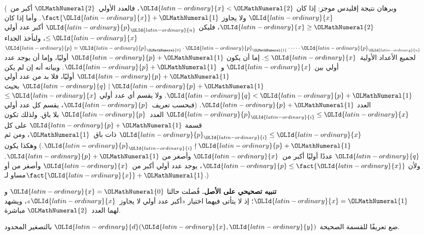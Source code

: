 \documentclass[../../../include/open-logic-section]{subfiles}
\begin{document}
(وبرهان نتيجة إقليدس موجز: إذا كان $\OLId{latin-ordinary}{x}<\OLMathNumeral{2}$، فالعدد الأولي~$\OLMathNumeral{2}$ أكبر
من~$\OLId{latin-ordinary}{x}$ ولا يجاوز $\fact{\OLId{latin-ordinary}{x}}+\OLMathNumeral{1}$. وأما إذا كان $\OLId{latin-ordinary}{x}\geq\OLMathNumeral{2}$، فليكن $\OLId{latin-ordinary}{p}_\OLId{latin-ordinary}{n}$
أكبر عدد أولي $\le \OLId{latin-ordinary}{x}$، ولنأخذ الجداء
$\OLId{latin-ordinary}{p}=\OLId{latin-ordinary}{p}_\OLMathNumeral{0}\cdot \OLId{latin-ordinary}{p}_\OLMathNumeral{1}\cdot\dots\cdot \OLId{latin-ordinary}{p}_\OLId{latin-ordinary}{n}$ لجميع الأعداد الأولية~$\le \OLId{latin-ordinary}{x}$.
إما أن يكون $\OLId{latin-ordinary}{p}+\OLMathNumeral{1}$ أوليًا، وإما أن يوجد عدد أولي بين $\OLId{latin-ordinary}{x}$ و~$\OLId{latin-ordinary}{p}+\OLMathNumeral{1}$.
وبيانه أنه إن لم يكن $\OLId{latin-ordinary}{p}+\OLMathNumeral{1}$ أوليًا، فلا بد من عدد أولي $\OLId{latin-ordinary}{q}\mid \OLId{latin-ordinary}{p}+\OLMathNumeral{1}$
بحيث $\OLId{latin-ordinary}{q}<\OLId{latin-ordinary}{p}+\OLMathNumeral{1}$. ولا يقسم أي عدد أولي $\le \OLId{latin-ordinary}{x}$ العدد $\OLId{latin-ordinary}{p}+\OLMathNumeral{1}$. (فبحسب
تعريف~$\OLId{latin-ordinary}{p}$، يقسم كل عدد أولي $\OLId{latin-ordinary}{p}_\OLId{latin-ordinary}{i}\le \OLId{latin-ordinary}{x}$ العدد~$\OLId{latin-ordinary}{p}$ بلا باق. ولذلك تكون
قسمة $\OLId{latin-ordinary}{p}+\OLMathNumeral{1}$ على كل $\OLId{latin-ordinary}{p}_\OLId{latin-ordinary}{i}\le \OLId{latin-ordinary}{x}$ ذات باق~$\OLMathNumeral{1}$، ومن ثم
$\OLId{latin-ordinary}{p}_\OLId{latin-ordinary}{i}\nmid \OLId{latin-ordinary}{p}+\OLMathNumeral{1}$.) وهكذا يكون $\OLId{latin-ordinary}{q}$ عددًا أوليًا أكبر من~$\OLId{latin-ordinary}{x}$ وأصغر من
$\OLId{latin-ordinary}{p}+\OLMathNumeral{1}$. ولأن $\OLId{latin-ordinary}{p}\le\fact{\OLId{latin-ordinary}{x}}$، يوجد عدد أولي أكبر من~$\OLId{latin-ordinary}{x}$ وأصغر من أو
مساو لـ$\fact{\OLId{latin-ordinary}{x}}+\OLMathNumeral{1}$.)

\textbf{تنبيه تصحيحي على الأصل.} فُصلت حالتا $\OLId{latin-ordinary}{x}=\OLMathNumeral{0}$ و$\OLId{latin-ordinary}{x}=\OLMathNumeral{1}$؛ إذ لا
يتأتى فيهما اختيار «أكبر عدد أولي لا يجاوز~$\OLId{latin-ordinary}{x}$»، ويشهد لهما العدد~$\OLMathNumeral{2}$
مباشرة.

\begin{prob}
ضع تعريفًا للقسمة الصحيحة $\OLId{latin-ordinary}{d}(\OLId{latin-ordinary}{x},\OLId{latin-ordinary}{y})$ بالتصغير المحدود.
\end{prob}
\end{document}
